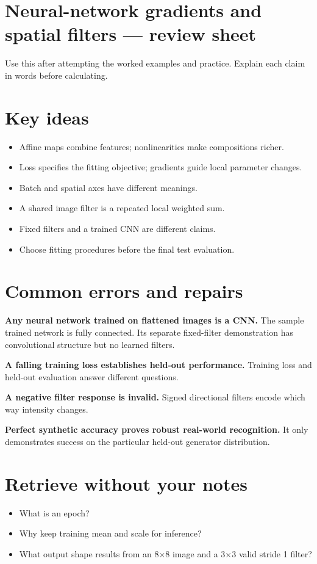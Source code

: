 \documentclass[11pt,letterpaper]{article}
\theoremstyle{definition}\newtheorem{definition}{Definition}\newtheorem{example}{Example}
\numberwithin{equation}{section}
\begin{document}
\setlength{\parskip}{4pt}
\section*{Neural-network gradients and spatial filters --- review sheet}
Use this after attempting the worked examples and practice. Explain each claim in words before calculating.

\section*{Key ideas}
\begin{itemize}
\item Affine maps combine features; nonlinearities make compositions richer.
\item Loss specifies the fitting objective; gradients guide local parameter changes.
\item Batch and spatial axes have different meanings.
\item A shared image filter is a repeated local weighted sum.
\item Fixed filters and a trained CNN are different claims.
\item Choose fitting procedures before the final test evaluation.
\end{itemize}
\section*{Common errors and repairs}
\textbf{Any neural network trained on flattened images is a CNN.} The sample trained network is fully connected. Its separate fixed-filter demonstration has convolutional structure but no learned filters.

\textbf{A falling training loss establishes held-out performance.} Training loss and held-out evaluation answer different questions.

\textbf{A negative filter response is invalid.} Signed directional filters encode which way intensity changes.

\textbf{Perfect synthetic accuracy proves robust real-world recognition.} It only demonstrates success on the particular held-out generator distribution.

\section*{Retrieve without your notes}
\begin{itemize}
\item What is an epoch?
\item Why keep training mean and scale for inference?
\item What output shape results from an 8$\times$8 image and a 3$\times$3 valid stride 1 filter?
\end{itemize}
\end{document}
